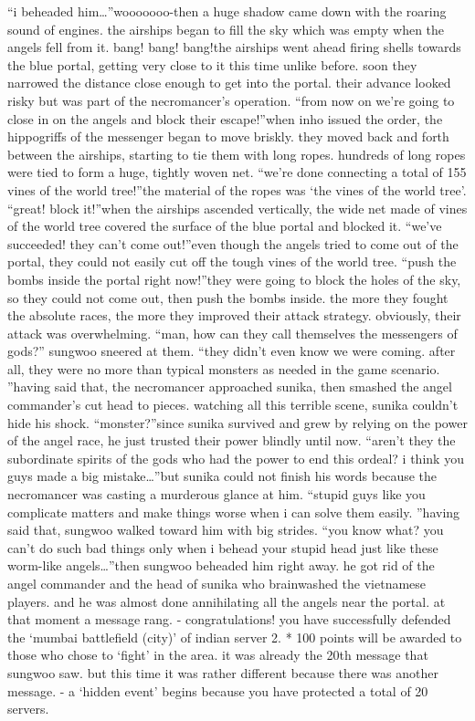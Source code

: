 “i beheaded him…”wooooooo-then a huge shadow came down with the roaring sound of engines.
 the airships began to fill the sky which was empty when the angels fell from it.
bang! bang! bang!the airships went ahead firing shells towards the blue portal, getting very close to it this time unlike before.
 soon they narrowed the distance close enough to get into the portal.
their advance looked risky but was part of the necromancer’s operation.
“from now on we’re going to close in on the angels and block their escape!”when inho issued the order, the hippogriffs of the messenger began to move briskly.
they moved back and forth between the airships, starting to tie them with long ropes.
hundreds of long ropes were tied to form a huge, tightly woven net.
“we’re done connecting a total of 155 vines of the world tree!”the material of the ropes was ‘the vines of the world tree’.
“great! block it!”when the airships ascended vertically, the wide net made of vines of the world tree covered the surface of the blue portal and blocked it.
“we’ve succeeded! they can’t come out!”even though the angels tried to come out of the portal, they could not easily cut off the tough vines of the world tree.
“push the bombs inside the portal right now!”they were going to block the holes of the sky, so they could not come out, then push the bombs inside.
 the more they fought the absolute races, the more they improved their attack strategy.
 obviously, their attack was overwhelming.
“man, how can they call themselves the messengers of gods?” sungwoo sneered at them.
 “they didn’t even know we were coming.
 after all, they were no more than typical monsters as needed in the game scenario.
”having said that, the necromancer approached sunika, then smashed the angel commander’s cut head to pieces.
watching all this terrible scene, sunika couldn’t hide his shock.
“monster?”since sunika survived and grew by relying on the power of the angel race, he just trusted their power blindly until now.
“aren’t they the subordinate spirits of the gods who had the power to end this ordeal? i think you guys made a big mistake…”but sunika could not finish his words because the necromancer was casting a murderous glance at him.
“stupid guys like you complicate matters and make things worse when i can solve them easily.
”having said that, sungwoo walked toward him with big strides.
“you know what? you can’t do such bad things only when i behead your stupid head just like these worm-like angels…”then sungwoo beheaded him right away.
 he got rid of the angel commander and the head of sunika who brainwashed the vietnamese players.
and he was almost done annihilating all the angels near the portal.
at that moment a message rang.
- congratulations! you have successfully defended the ‘mumbai battlefield (city)’ of indian server 2.
* 100 points will be awarded to those who chose to ‘fight’ in the area.
it was already the 20th message that sungwoo saw.
but this time it was rather different because there was another message.
- a ‘hidden event’ begins because you have protected a total of 20 servers.


